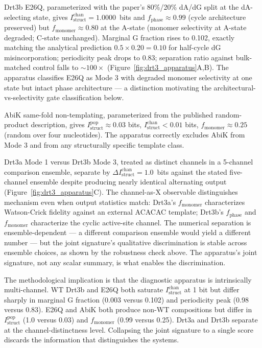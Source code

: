 \documentclass[aps,prx,reprint,amsmath,amssymb,floatfix,superscriptaddress,nofootinbib]{revtex4-2}
\theoremstyle{plain-thm}
\theoremstyle{definition-thm}
\newcommand{\Istructpop}{I_{\mathrm{struct}}^{\mathrm{pop}}}
\newcommand{\Istructchan}{I_{\mathrm{struct}}^{\mathrm{chan}}}
\newcommand{\fphase}{f_{\mathrm{phase}}}
\newcommand{\fmonomer}{f_{\mathrm{monomer}}}
\begin{document}
Drt3b E26Q, parameterized with the paper's 80\%/20\% dA/dG split at the dA-selecting state, gives $\Istructchan = 1.0000$~bits and $\fphase \approx 0.99$ (cycle architecture preserved) but $\fmonomer \approx 0.80$ at the A-state (monomer selectivity at A-state degraded; C-state unchanged). Marginal G fraction rises to 0.102, exactly matching the analytical prediction $0.5 \times 0.20 = 0.10$ for half-cycle dG misincorporation; periodicity peak drops to 0.83; separation ratio against bulk-matched control falls to $\sim 100\times$ (Figure~\ref{fig:drt3_apparatus}A,B). The apparatus classifies E26Q as Mode 3 with degraded monomer selectivity at one state but intact phase architecture --- a distinction motivating the architectural-vs-selectivity gate classification below.

AbiK same-fold non-templating, parameterized from the published random-product description, gives $\Istructpop \approx 0.03$ bits, $\Istructchan < 0.01$ bits, $\fmonomer \approx 0.25$ (random over four nucleotides). The apparatus correctly excludes AbiK from Mode 3 and from any structurally specific template class.

Drt3a Mode 1 versus Drt3b Mode 3, treated as distinct channels in a 5-channel comparison ensemble, separate by $\Delta\Istructchan = 1.0$~bits against the stated five-channel ensemble despite producing nearly identical alternating output (Figure~\ref{fig:drt3_apparatus}C). The channel-as-X observable distinguishes mechanism even when output statistics match: Drt3a's $\fmonomer$ characterizes Watson-Crick fidelity against an external ACACAC template; Drt3b's $\fphase$ and $\fmonomer$ characterize the cyclic active-site channel. The numerical separation is ensemble-dependent --- a different comparison ensemble would yield a different number --- but the joint signature's qualitative discrimination is stable across ensemble choices, as shown by the robustness check above. The apparatus's joint signature, not any scalar summary, is what enables the discrimination.

The methodological implication is that the diagnostic apparatus is intrinsically multi-channel. WT Drt3b and E26Q both saturate $\Istructchan$ at 1 bit but differ sharply in marginal G fraction (0.003 versus 0.102) and periodicity peak (0.98 versus 0.83). E26Q and AbiK both produce non-WT compositions but differ in $\Istructpop$ (1.0 versus 0.03) and $\fmonomer$ (0.99 versus 0.25). Drt3a and Drt3b separate at the channel-distinctness level. Collapsing the joint signature to a single score discards the information that distinguishes the systems.
\end{document}
